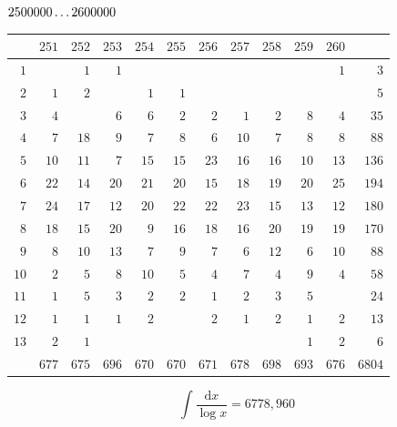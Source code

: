 \par\medskip
\noindent\begin{minipage}{\linewidth}\centering
{}
\(2500000\mathinner{.\,.\,.}2600000\)\par\smallskip
\begingroup\fontsize{10.5}{11.5}\selectfont\setlength{\tabcolsep}{3.5pt}\renewcommand{\arraystretch}{1}
\begin{tabular}{r|rrrrrrrrrr|r}\hline
 & $251$ & $252$ & $253$ & $254$ & $255$ & $256$ & $257$ & $258$ & $259$ & $260$ &  \\ \hline
$1$ &  & $1$ & $1$ &  &  &  &  &  &  & $1$ & $3$ \\
$2$ & $1$ & $2$ &  & $1$ & $1$ &  &  &  &  &  & $5$ \\
$3$ & $4$ &  & $6$ & $6$ & $2$ & $2$ & $1$ & $2$ & $8$ & $4$ & $35$ \\
$4$ & $7$ & $18$ & $9$ & $7$ & $8$ & $6$ & $10$ & $7$ & $8$ & $8$ & $88$ \\
$5$ & $10$ & $11$ & $7$ & $15$ & $15$ & $23$ & $16$ & $16$ & $10$ & $13$ & $136$ \\
$6$ & $22$ & $14$ & $20$ & $21$ & $20$ & $15$ & $18$ & $19$ & $20$ & $25$ & $194$ \\
$7$ & $24$ & $17$ & $12$ & $20$ & $22$ & $22$ & $23$ & $15$ & $13$ & $12$ & $180$ \\
$8$ & $18$ & $15$ & $20$ & $9$ & $16$ & $18$ & $16$ & $20$ & $19$ & $19$ & $170$ \\
$9$ & $8$ & $10$ & $13$ & $7$ & $9$ & $7$ & $6$ & $12$ & $6$ & $10$ & $88$ \\
$10$ & $2$ & $5$ & $8$ & $10$ & $5$ & $4$ & $7$ & $4$ & $9$ & $4$ & $58$ \\
$11$ & $1$ & $5$ & $3$ & $2$ & $2$ & $1$ & $2$ & $3$ & $5$ &  & $24$ \\
$12$ & $1$ & $1$ & $1$ & $2$ &  & $2$ & $1$ & $2$ & $1$ & $2$ & $13$ \\
$13$ & $2$ & $1$ &  &  &  &  &  &  & $1$ & $2$ & $6$ \\
\hline
 & $677$ & $675$ & $696$ & $670$ & $670$ & $671$ & $678$ & $698$ & $693$ & $676$ & $6804$ \\ \hline
\end{tabular}\par\endgroup
\setlength{\abovedisplayskip}{6pt}\setlength{\belowdisplayskip}{4pt}
\[\int\frac{\mathrm{d}x}{\log x}=6778{,}960\]
\end{minipage}
